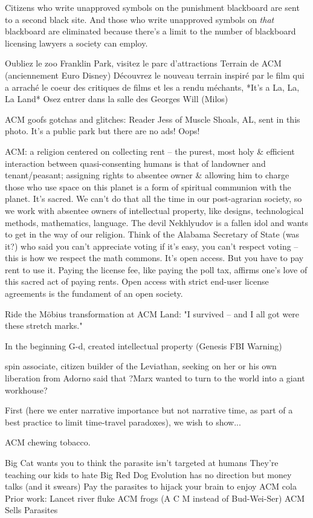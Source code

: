 Citizens who write unapproved symbols on the punishment blackboard are sent to a second black site. And those who write unapproved symbols on \emph{that} blackboard are eliminated because there's a limit to the number of blackboard licensing lawyers a society can employ.

Oubliez le zoo Franklin Park, visitez le parc d'attractions Terrain de ACM (anciennement Euro Disney)
Découvrez le nouveau terrain inspiré par le film qui a arraché le coeur des critiques de films et les a rendu méchants, *It's a La, La, La Land*
Osez entrer dans la salle des Georges Will (Milos) 

ACM goofs gotchas and glitches:
Reader Jess of Muscle Shoals, AL, sent in this photo. It's a public park but there are no ads! Oops!

ACM: a religion centered on collecting rent -- the purest, most holy & efficient interaction between quasi-consenting humans is that of landowner and tenant/peasant; assigning rights to absentee owner & allowing him to charge those who use space on this planet is a form of spiritual communion with the planet. It's sacred. We can't do that all the time in our post-agrarian society, so we work with absentee owners of intellectual property, like designs, technological methods, mathematics, language. The devil Nekhlyudov is a fallen idol and wants to get in the way of our religion. Think of the Alabama Secretary of State (was it?) who said you can't appreciate voting if it's easy, you can't respect voting -- this is how we respect the math commons. It's open access. But you have to pay rent to use it. Paying the license fee, like paying the poll tax, affirms one's love of this sacred act of paying rents. Open access with strict end-user license agreements is the fundament of an open society.

Ride the Möbius transformation at ACM Land: "I survived -- and I all got were these stretch marks."

In the beginning G-d, created intellectual property (Genesis FBI Warning) 

spin associate, citizen builder of the Leviathan, seeking on her or his own liberation from
Adorno said that ?Marx wanted to turn to the world into a giant workhouse?

First (here we enter narrative importance but not narrative time, as part of a best practice to limit time-travel paradoxes), we wish to show... 

ACM chewing tobacco.

Big Cat wants you to think the parasite isn't targeted at humans
They're teaching our kids to hate Big Red Dog
Evolution has no direction but money talks (and it swears)
Pay the parasites to hijack your brain to enjoy ACM cola
Prior work: Lancet river fluke
ACM frogs (A C M instead of Bud-Wei-Ser)
ACM Sells Parasites

